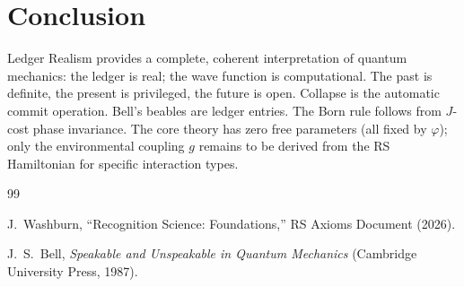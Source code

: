 \documentclass[12pt,a4paper]{article}
\theoremstyle{definition}
\theoremstyle{remark}
\begin{document}
\section{Conclusion}
\label{sec:conclusion}

Ledger Realism provides a complete, coherent interpretation of
quantum mechanics: the ledger is real; the wave function is
computational.  The past is definite, the present is privileged,
the future is open.  Collapse is the automatic commit operation.
Bell's beables are ledger entries.  The Born rule follows from
$J$-cost phase invariance.  The core theory has zero free
parameters (all fixed by $\varphi$); only the environmental
coupling $g$ remains to be derived from the RS Hamiltonian for
specific interaction types.

\begin{thebibliography}{99}

J.~Washburn, ``Recognition Science: Foundations,''
RS Axioms Document (2026).

J.~S.~Bell, \textit{Speakable and Unspeakable in Quantum
Mechanics} (Cambridge University Press, 1987).

\end{thebibliography}
\end{document}
